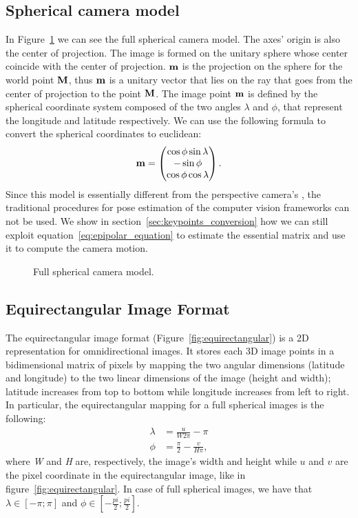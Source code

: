 \subsection{Spherical camera model}
\label{subsec:spherical_camera_model}
In Figure~\ref{fig:camera_model} we can see the full spherical camera model.
The axes' origin is also the center of projection. The image is formed on 
the unitary sphere whose center coincide with the center of projection.
$\mathbf{m}$ is the projection on the sphere for the world point 
$\mathbf{M}$, thus $\mathbf{m}$ is a unitary vector that lies on the ray that goes
from the center of projection to the point $\mathbf{M}$.
The image point $\mathbf{m}$ is defined by the spherical coordinate 
system composed of the two angles $\lambda$ and $\phi$, that represent the 
longitude and latitude respectively. 
We can use the following formula to convert the spherical coordinates to 
euclidean:
\begin{equation*}
	\mathbf{m} =
	\begin{pmatrix}
		\cos\phi\sin\lambda \\
		-\sin\phi \\
		\cos\phi\cos\lambda
	\end{pmatrix}	\text{.}
\end{equation*}
Since this model is essentially different from the 
perspective camera's \cite{szeliski2010computer}, the traditional procedures 
for pose estimation of the computer vision frameworks can not be used.
We show in section~\ref{sec:keypoints_conversion} how we can still exploit
equation~\ref{eq:epipolar_equation} to estimate the essential matrix and use it
to compute the camera motion.
\begin{figure}[h]
    \centering
    \def\svgwidth{0.5\columnwidth}
    
    \caption{Full spherical camera model.}
	\label{fig:camera_model}
\end{figure}

\subsection{Equirectangular Image Format}
\label{subsec:image_format}
The equirectangular image format (Figure~\ref{fig:equirectangular}) is a 2D
representation for omnidirectional 
images. It stores each 3D image points in a bidimensional matrix of pixels
by mapping the two angular dimensions (latitude and longitude) to the two
linear dimensions of the image (height and width); latitude increases from 
top to bottom while longitude increases from left to right.
In particular, the equirectangular mapping for a full spherical images is the
following:
\begin{align}
\label{eq:llConversion}
\lambda &= \frac{u}{W 2 \pi} - \pi \\
\phi &= \frac{\pi}{2} - \frac{v}{H \pi}\text{,}
\end{align}
\noindent where \textit{W} and \textit{H} are, respectively, 
the image's width and height while $u$ and $v$ are the pixel coordinate 
in the equirectangular image, like in figure~\ref{fig:equirectangular}.
In case of full spherical images, we have that
$ \lambda \in [-\pi; \pi] $ and $\phi \in [-\frac{pi}{2}; \frac{pi}{2}] $.

